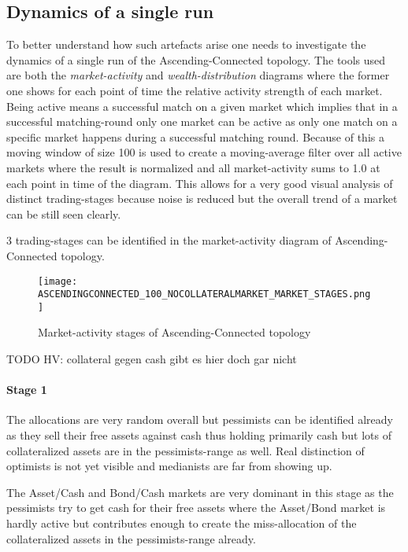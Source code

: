 \documentclass[Bachelorarbeit.tex]{subfiles}
\begin{document}
\subsection{Dynamics of a single run}
\label{sub:dynamics_singlerun}
To better understand how such artefacts arise one needs to investigate the dynamics of a single run of the Ascending-Connected topology. The tools used are both the \textit{market-activity} and \textit{wealth-distribution} diagrams where the former one shows for each point of time the relative activity strength of each market. Being active means a successful match on a given market which implies that in a successful matching-round only one market can be active as only one match on a specific market happens during a successful matching round. Because of this a moving window of size 100 is used to create a moving-average filter over all active markets where the result is normalized and all market-activity sums to 1.0 at each point in time of the diagram. This allows for a very good visual analysis of distinct trading-stages because noise is reduced but the overall trend of a market can be still seen clearly.

\medskip

3 trading-stages can be identified in the market-activity diagram of Ascending-Connected topology.

\begin{figure}[H]
	\centering
  \texttt{[image: ASCENDINGCONNECTED\_100\_NOCOLLATERALMARKET\_MARKET\_STAGES.png]}
  	\caption{Market-activity stages of Ascending-Connected topology}
	\label{fig:markets_ASCENDINGCONNECTED_100_NOCOLLATERALMARKET_MARKET_STAGES}
\end{figure}

TODO HV: collateral gegen cash gibt es hier doch gar nicht

\paragraph{Stage 1}
The allocations are very random overall but pessimists can be identified already as they sell their free assets against cash thus holding primarily cash but lots of collateralized assets are in the pessimists-range as well. Real distinction of optimists is not yet visible and medianists are far from showing up.

\medskip

The Asset/Cash and Bond/Cash markets are very dominant in this stage as the pessimists try to get cash for their free assets where the Asset/Bond market is hardly active but contributes enough to create the miss-allocation of the collateralized assets in the pessimists-range already.
\end{document}
